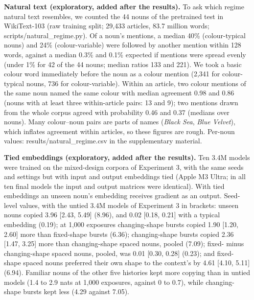 \textbf{Natural text (exploratory, added after the results).} To ask which regime natural text resembles, we counted the 44 nouns of the pretrained test in WikiText-103 (raw training split; 29,433 articles, 83.7 million words; scripts/natural\_regime.py). Of a noun's mentions, a median 40\% (colour-typical nouns) and 24\% (colour-variable) were followed by another mention within 128 words, against a median 0.3\% and 0.1\% expected if mentions were spread evenly (under 1\% for 42 of the 44 nouns; median ratios 133 and 221). We took a basic colour word immediately before the noun as a colour mention (2,341 for colour-typical nouns, 736 for colour-variable). Within an article, two colour mentions of the same noun named the same colour with median agreement 0.98 and 0.86 (nouns with at least three within-article pairs: 13 and 9); two mentions drawn from the whole corpus agreed with probability 0.46 and 0.37 (medians over nouns). Many colour--noun pairs are parts of names (\emph{Black Sea}, \emph{Blue Velvet}), which inflates agreement within articles, so these figures are rough. Per-noun values: results/natural\_regime.csv in the supplementary material.

\textbf{Tied embeddings (exploratory, added after the results).} Ten 3.4M models were trained on the mixed-design corpora of Experiment 3, with the same seeds and settings but with input and output embeddings tied (Apple M3 Ultra; in all ten final models the input and output matrices were identical). With tied embeddings an unseen noun's embedding receives gradient as an output. Seed-level values, with the untied 3.4M models of Experiment 3 in brackets: unseen nouns copied 3.96 [2.43, 5.49] (8.96), and 0.02 [\textminus{}0.18, 0.21] with a typical embedding (\textminus{}0.19); at 1,000 exposures changing-shape bursts copied 1.90 [1.20, 2.60] more than fixed-shape bursts (6.36); changing-shape bursts copied 2.36 [1.47, 3.25] more than changing-shape spaced nouns, pooled (7.09); fixed- minus changing-shape spaced nouns, pooled, was \textminus{}0.01 [\textminus{}0.30, 0.28] (\textminus{}0.23); and fixed-shape spaced nouns preferred their own shape to the context's by 4.61 [4.10, 5.11] (6.94). Familiar nouns of the other five histories kept more copying than in untied models (1.4 to 2.9 nats at 1,000 exposures, against 0 to 0.7), while changing-shape bursts kept less (4.29 against 7.05).

